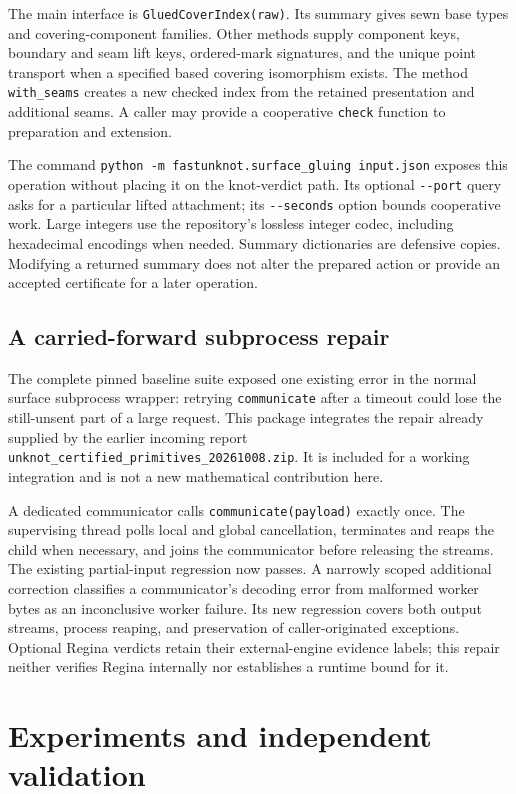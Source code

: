 \documentclass[11pt,a4paper]{article}
\theoremstyle{definition}\newtheorem{definition}[theorem]{Definition}
\theoremstyle{remark}\newtheorem{remark}[theorem]{Remark}
\newcommand{\code}[1]{\nolinkurl{#1}}
\begin{document}
The main interface is \code{GluedCoverIndex(raw)}. Its summary gives sewn
base types and covering-component families. Other methods supply component
keys, boundary and seam lift keys, ordered-mark signatures, and the unique
point transport when a specified based covering isomorphism exists. The
method \code{with_seams} creates a new checked index from the retained
presentation and additional seams. A caller may provide a cooperative
\code{check} function to preparation and extension.

The command \code{python -m fastunknot.surface_gluing input.json} exposes
this operation without placing it on the knot-verdict path. Its optional
\code{--port} query asks for a particular lifted attachment; its
\code{--seconds} option bounds cooperative work. Large integers use the
repository's lossless integer codec, including hexadecimal encodings when
needed. Summary dictionaries are defensive copies. Modifying a returned
summary does not alter the prepared action or provide an accepted
certificate for a later operation.

\subsection{A carried-forward subprocess repair}

The complete pinned baseline suite exposed one existing error in the normal
surface subprocess wrapper: retrying \code{communicate} after a timeout
could lose the still-unsent part of a large request. This package integrates
the repair already supplied by the earlier incoming report
\code{unknot_certified_primitives_20261008.zip}. It is included for a
working integration and is not a new mathematical contribution here.

A dedicated communicator calls \code{communicate(payload)} exactly once.
The supervising thread polls local and global cancellation, terminates and
reaps the child when necessary, and joins the communicator before releasing
the streams. The existing partial-input regression now passes. A narrowly
scoped additional correction classifies a communicator's decoding error
from malformed worker bytes as an inconclusive worker failure. Its new
regression covers both output streams, process reaping, and preservation
of caller-originated exceptions. Optional
Regina verdicts retain their external-engine evidence labels; this repair
neither verifies Regina internally nor establishes a runtime bound for it.

\section{Experiments and independent validation}
\label{sec:experiments}
\end{document}
